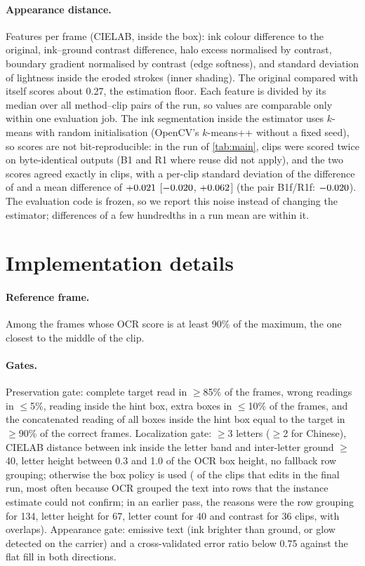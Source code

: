 \paragraph{Appearance distance.} Features per frame (CIELAB, inside the box): ink colour difference to the original, ink--ground contrast difference, halo excess normalised by contrast, boundary gradient normalised by contrast (edge softness), and standard deviation of lightness inside the eroded strokes (inner shading). The original compared with itself scores about 0.27, the estimation floor. Each feature is divided by its median over all method--clip pairs of the run, so values are comparable only within one evaluation job. The ink segmentation inside the estimator uses $k$-means with random initialisation (OpenCV's $k$-means++ without a fixed seed), so scores are not bit-reproducible: in the run of \cref{tab:main}, \rRetestN{} clips were scored twice on byte-identical outputs (B1 and R1 where reuse did not apply), and the two scores agreed exactly in \rRetestSame{} clips, with a per-clip standard deviation of the difference of \rRetestSD{} and a mean difference of $+0.021$ [$-0.020$, $+0.062$] (the pair B1f/R1f: $-0.020$). The evaluation code is frozen, so we report this noise instead of changing the estimator; differences of a few hundredths in a run mean are within it.

\section{Implementation details}
\label{sec:supp_impl}

\paragraph{Reference frame.} Among the frames whose OCR score is at least 90\% of the maximum, the one closest to the middle of the clip.

\paragraph{Gates.} Preservation gate: complete target read in $\geq$85\% of the frames, wrong readings in $\leq$5\%, reading inside the hint box, extra boxes in $\leq$10\% of the frames, and the concatenated reading of all boxes inside the hint box equal to the target in $\geq$90\% of the correct frames. Localization gate: $\geq$3 letters ($\geq$2 for Chinese), CIELAB distance between ink inside the letter band and inter-letter ground $\geq$40, letter height between 0.3 and 1.0 of the OCR box height, no fallback row grouping; otherwise the box policy is used (\rBoxPolicy{} of the \rOursCollatN{} clips that \method edits in the final run, most often because OCR grouped the text into rows that the instance estimate could not confirm; in an earlier pass, the reasons were the row grouping for 134, letter height for 67, letter count for 40 and contrast for 36 clips, with overlaps). Appearance gate: emissive text (ink brighter than ground, or glow detected on the carrier) and a cross-validated error ratio below 0.75 against the flat fill in both directions.

